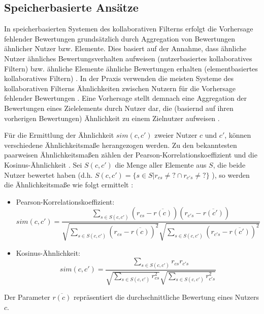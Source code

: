 \subsection{Speicherbasierte Ansätze}
In speicherbasierten Systemen des kollaborativen Filterns erfolgt die Vorhersage fehlender Bewertungen grundsätzlich durch Aggregation \cite[S.738]{adomavicius:inproceedings} von Bewertungen ähnlicher Nutzer bzw. Elemente.
Dies basiert auf der Annahme, dass ähnliche Nutzer ähnliches Bewertungsverhalten aufweisen (nutzerbasiertes kollaboratives Filtern) bzw. ähnliche Elemente ähnliche Bewertungen erhalten (elementbasiertes kollaboratives Filtern) \cite[S. 29]{recommenderSystems:2016}.
In der Praxis verwenden die meisten Systeme des kollaborativen Filterns Ähnlichkeiten zwischen Nutzern für die Vorhersage fehlender Bewertungen \cite[S. 427]{recommenderSystems:2016}.
Eine Vorhersage stellt demnach eine Aggregation der Bewertungen eines Zielelements durch Nutzer dar, die (basiernd auf ihren vorherigen Bewertungen) Ähnlichkeit zu einem Zielnutzer aufweisen \cite[S.738]{adomavicius:inproceedings}.

Für die Ermittlung der Ähnlichkeit $sim(c,c')$ zweier Nutzer $c$ und $c'$, können verschiedene Ähnlichkeitsmaße herangezogen werden.
Zu den bekanntesten paarweisen Ähnlichkeitsmaßen zählen der Pearson-Korrelationskoeffizient und die Kosinus-Ähnlichkeit \cite[S. 856]{adomavicius:4:inbook}\cite[S. 738]{adomavicius:inproceedings}.
Sei $S(c,c')$ die Menge aller Elemente aus $S$, die beide Nutzer bewertet haben (d.h. $S(c,c')=\{s \in S | r_{cs} \neq ? \cap r_{c's} \neq ?\}$ \cite[S. 738]{adomavicius:inproceedings}), so werden die Ähnlichkeitsmaße wie folgt ermittelt \cite[S. 856]{adomavicius:4:inbook}:
\begin{itemize}
    \item Pearson-Korrelationskoeffizient:
    \begin{equation}\label{eq13}
        sim(c,c') = \frac{\sum\limits_{s \in S(c,c')}(r_{cs}-\overline{r(c)})(r_{c's}-\overline{r(c')})}{\sqrt{\sum\limits_{s \in S(c,c')}(r_{cs}-\overline{r(c)})^{2}}\sqrt{\sum\limits_{s \in S(c,c')}(r_{c's}-\overline{r(c')})^{2}}}
    \end{equation}
    \item Kosinus-Ähnlichkeit:
    \begin{equation}\label{eq14}
        sim(c,c') = \frac{\sum\limits_{s \in S(c,c')}r_{cs}r_{c's}}{\sqrt{\sum\limits_{s \in S(c,c')}r_{cs}^{2}}\sqrt{\sum\limits_{s \in S(c,c')}r_{c's}^{2}}}
    \end{equation}
\end{itemize}
Der Parameter $\overline{r(c)}$ repräsentiert die durchschnittliche Bewertung eines Nutzers $c$.


